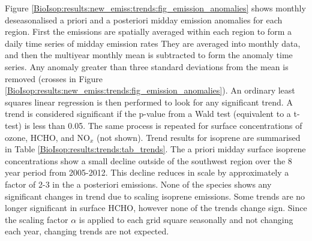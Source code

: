       Figure \ref{BioIsop:results:new_emiss:trends:fig_emission_anomalies} shows monthly deseasonalised a priori and a posteriori midday emission anomalies for each region.
      First the emissions are spatially averaged within each region to form a daily time series of midday emission rates
      They are averaged into monthly data, and then the multiyear monthly mean is subtracted to form the anomaly time series.
      Any anomaly greater than three standard deviations from the mean is removed (crosses in Figure \ref{BioIsop:results:new_emiss:trends:fig_emission_anomalies}).
      An ordinary least squares linear regression is then performed to look for any significant trend.
      A trend is considered significant if the p-value from a Wald test (equivalent to a t-test) is less than 0.05.
      The same process is repeated for surface concentrations of ozone, HCHO, and NO$_x$ (not shown).
      Trend results for isoprene are summarised in Table \ref{BioIsop:results:trends:tab_trends}.
      The a priori midday surface isoprene concentrations show a small decline outside of the southwest region over the 8 year period from 2005-2012.
      This decline reduces in scale by approximately a factor of 2-3 in the a posteriori emissions.
      None of the species shows any significant changes in trend due to scaling isoprene emissions.
      Some trends are no longer significant in surface HCHO, however none of the trends change sign.
      Since the scaling factor $\alpha$ is applied to each grid square seasonally and not changing each year, changing trends are not expected.
      
